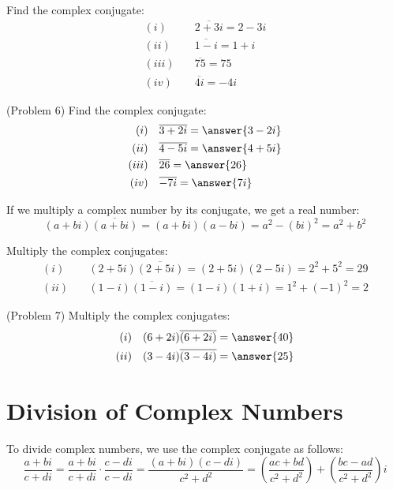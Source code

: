 \documentclass[handout]{ximera}
\begin{document}
\begin{example}[Example 6]
Find the complex conjugate:
\begin{align*}
(i)& \quad \overline {2+3i} = 2-3i \\
(ii)& \quad \overline {1-i} = 1+i \\
(iii)& \quad \overline {75} = 75 \\
(iv)& \quad \overline {4i} = -4i
\end{align*}
\end{example}


\begin{problem}(Problem 6)
Find the complex conjugate:
\begin{align*}
(i)& \quad {\overline {3+2i}} = \answer{3-2i} \\
(ii)& \quad {\overline {4-5i}} = \answer{4+5i}\\
(iii)& \quad {\overline {26}}= \answer{26}\\
(iv)& \quad {\overline {-7i}}= \answer{7i}
\end{align*}
\end{problem}


If we multiply a complex number by its conjugate, we get a real number:
\[
(a+bi)  \overline{(a+bi)} = (a+bi)(a-bi) = a^2 - (bi)^2 = a^2 +b^2
\]

\begin{example}[Example 7]
Multiply the complex conjugates:
\begin{align*}
(i)& \quad (2+5i) \overline {(2+5i)} = (2+5i)(2-5i) = 2^2 + 5^2 = 29\\
(ii)& \quad (1-i) \overline {(1-i)} = (1-i)(1+i) = 1^2 + (-1)^2 = 2
\end{align*}
\end{example}

\begin{problem}(Problem 7)
Multiply the complex conjugates:
\begin{align*}
(i)& \quad (6+2i) \overline{(6+2i)} = \answer{40} \\
(ii)& \quad (3-4i) \overline {(3-4i)} = \answer{25}
\end{align*}
\end{problem}


\section{Division of Complex Numbers}
To divide complex numbers, we use the complex conjugate as follows:
\[
\frac{a+bi}{c+di} = \frac{a+bi}{c+di}\cdot\frac{c-di}{c-di} = \frac{(a+bi)(c-di)}{c^2 + d^2} = \left(\frac{ac+bd}{c^2 + d^2}\right) + \left(\frac{bc-ad}{c^2 + d^2}\right)i
\]
\end{document}
